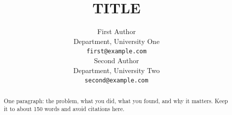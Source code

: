 \documentclass{article}
\title{{{TITLE}}}
\author{First Author \\
Department, University One \\
\texttt{first@example.com} \\
\And
Second Author \\
Department, University Two \\
\texttt{second@example.com}
}
\begin{document}
\maketitle

\begin{abstract}
One paragraph: the problem, what you did, what you found, and why it matters. Keep it to about 150 words and avoid citations here.
\end{abstract}






\end{document}
